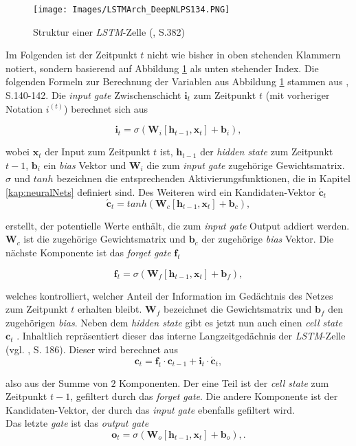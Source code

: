 \documentclass[a4paper,11pt]{article}
\begin{document}
\begin{figure}[!ht]
\begin{center}
\texttt{[image: Images/LSTMArch\_DeepNLPS134.PNG]}
\caption{Struktur einer \textit{LSTM}-Zelle (\cite{deepNLP}, S.382)}
\label{abb:LSTMArch}
\end{center}
\end{figure}

Im Folgenden ist der Zeitpunkt $t$ nicht wie bisher in oben stehenden Klammern notiert, sondern basierend auf Abbildung \ref{abb:LSTMArch} als unten stehender Index. Die folgenden Formeln zur Berechnung der Variablen aus Abbildung \ref{abb:LSTMArch} stammen aus \cite{deepNLP}, S.140-142.
Die \textit{input gate} Zwischenschicht $\bm{i}_t$ zum Zeitpunkt $t$ (mit vorheriger Notation $i^{(t)}$)  berechnet sich aus

\[ \bm{i}_t = \sigma(\bm{W}_i [\bm{h}_{t-1}, \bm{x}_t] + \bm{b}_i),\]

wobei $\bm{x}_t$ der Input zum Zeitpunkt $t$ ist, $\bm{h}_{t-1}$ der \textit{hidden state} zum Zeitpunkt $t-1$, $\bm{b}_i$ ein \textit{bias} Vektor und $\bm{W}_i$ die zum \textit{input gate} zugehörige Gewichtsmatrix. $\sigma$ und $tanh$ bezeichnen die entsprechenden Aktivierungsfunktionen, die in Kapitel \ref{kap:neuralNets} definiert sind. Des Weiteren wird ein Kandidaten-Vektor $\bm{\acute{c}}_t$ 
\[\bm{\acute{c}}_t = tanh(\bm{W}_c [\bm{h}_{t-1}, \bm{x}_t] + \bm{b}_c),\]

erstellt, der potentielle Werte enthält, die zum \textit{input gate} Output addiert werden. $\bm{W}_c$ ist die zugehörige Gewichtsmatrix und $\bm{b}_c$ der zugehörige \textit{bias} Vektor. Die nächste Komponente ist das \textit{forget gate} $\bm{f}_t$

\[  \bm{f}_t = \sigma(\bm{W}_f [\bm{h}_{t-1}, \bm{x}_t] + \bm{b}_f), \]

welches kontrolliert, welcher Anteil der Information im Gedächtnis des Netzes zum Zeitpunkt $t$ erhalten bleibt. $\bm{W}_f$ bezeichnet die Gewichtsmatrix und $\bm{b}_f$ den zugehörigen \textit{bias}. Neben dem \textit{hidden state} gibt es jetzt nun auch einen \textit{cell state} $\bm{c}_t$ . Inhaltlich repräsentiert dieser das interne Langzeitgedächnis der \textit{LSTM}-Zelle (vgl. \cite{keras}, S. 186). Dieser wird berechnet aus
\[\bm{c}_t = \bm{f}_t \cdot \bm{c}_{t-1} + \bm{i}_t \cdot \bm{\acute{c}}_t ,\]

also aus der Summe von $2$ Komponenten. Der eine Teil ist der \textit{cell state} zum Zeitpunkt $t-1$, gefiltert durch das \textit{forget gate}. Die andere Komponente ist der Kandidaten-Vektor, der durch das \textit{input gate} ebenfalls gefiltert wird.\\
Das letzte \textit{gate} ist das \textit{output gate} 
\[  \bm{o}_t = \sigma(\bm{W}_o [\bm{h}_{t-1}, \bm{x}_t] + \bm{b}_o), .\]
\end{document}
